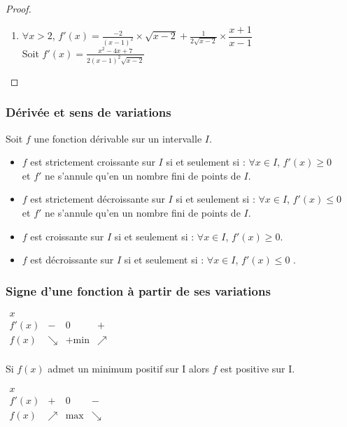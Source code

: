 \begin{proof}
\begin{enumerate}
 \item $ \forall x > 2  $, $ f'(x)= \frac{-2}{(x-1)^{2}}\times \sqrt{x-2}+ \frac{1}{2\sqrt{x-2}}\times \dfrac{x+1}{x-1} $\\
Soit  $ f'(x)=\frac{x^{2}-4x+7}{2(x-1)^{2}\sqrt{x-2}} $
\end{enumerate}
\end{proof}
\subsubsection*{Dérivée et sens de variations}
\begin{theorem}
Soit $ f $ une fonction dérivable sur un intervalle $ I. $
\begin{itemize}
\item[\textbullet] $f$ est strictement croissante sur $I$ si et seulement si : $ ∀ x\in I$, $f '(x) ≥ 0 $ \\et $f'$ ne s'annule qu'en un nombre fini de points de $I$. 
\item[\textbullet] $f$ est strictement décroissante sur $I$ si et seulement si : $ ∀ x\in I$, $f '(x)  \leq 0 $ \\ et $f'$ ne s'annule qu'en un nombre fini de points de $I$.
\item[\textbullet] $f$ est  croissante sur $I$ si et seulement si : $ ∀ x\in I$, $f '(x) ≥ 0 $. 
\item[\textbullet] $f$ est  décroissante sur $I$ si et seulement si : $ ∀ x\in I$, $f '(x) \leq 0 $ .  
\end{itemize}
\end{theorem}
 \subsubsection*{Signe d'une fonction à partir de ses variations}



$\begin{array}{c|ccccc}
x &        &  &       &       \\
\hline
f'(x) & - & 0       & +     &       \\
\hline
f(x) & \searrow & \text{+min} & \nearrow & \\
\end{array}
$

Si  $f(x)$  admet un minimum positif  
sur  I  alors  $f$  est positive sur  I.
\bigskip


$\begin{array}{c|ccccc}
x &        &  &       &       \\
\hline
f'(x) & + & 0       & -     &       \\
\hline
f(x) & \nearrow & \text{max} & \searrow & \\
\end{array}
$

